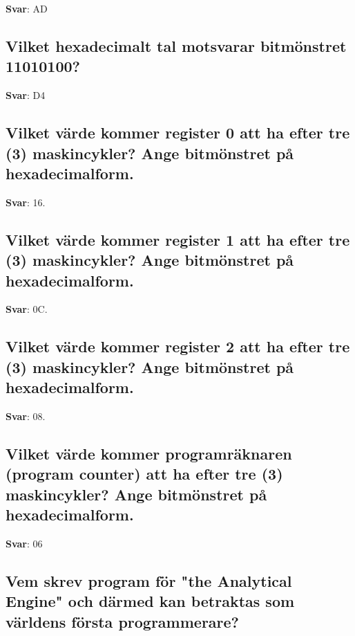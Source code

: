 \documentclass[a4paper,11pt,oneside]{article}
\begin{document}
\begin{sloppypar}
\textbf{Svar}: AD



\subsection{Vilket hexadecimalt tal motsvarar bitm\"onstret 11010100?}

\label{q:429:sa:sv:True}

\textbf{Svar}: D4



\subsection{Vilket v\"arde kommer register 0 att ha efter tre (3) maskincykler? Ange bitm\"onstret p\r{a} hexadecimalform.}

\label{q:430:sa:sv:True}

\textbf{Svar}: 16.



\subsection{Vilket v\"arde kommer register 1 att ha efter tre (3) maskincykler? Ange bitm\"onstret p\r{a} hexadecimalform.}

\label{q:431:sa:sv:True}

\textbf{Svar}: 0C.



\subsection{Vilket v\"arde kommer register 2 att ha efter tre (3) maskincykler? Ange bitm\"onstret p\r{a} hexadecimalform.}

\label{q:432:sa:sv:True}

\textbf{Svar}: 08.



\subsection{Vilket v\"arde kommer programr\"aknaren (program counter) att ha efter tre (3) maskincykler? Ange bitm\"onstret p\r{a} hexadecimalform.}

\label{q:433:sa:sv:True}

\textbf{Svar}: 06



\subsection{Vem skrev program f\"or "the Analytical Engine" och d\"armed kan betraktas som v\"arldens f\"orsta programmerare?}


\end{sloppypar}
\end{document}
